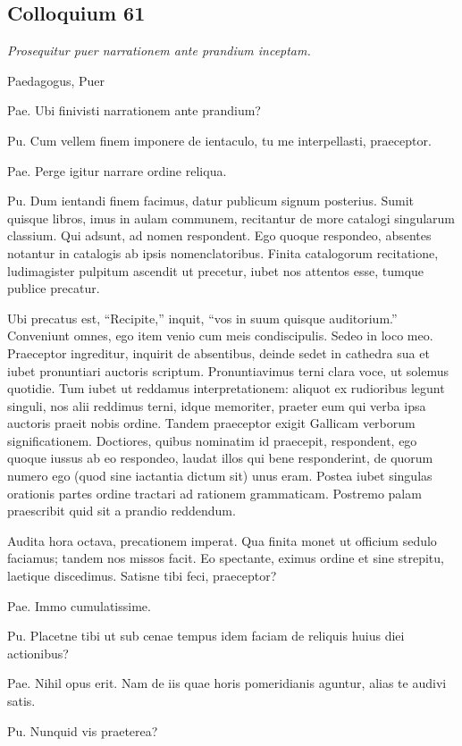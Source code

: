 \documentclass{article}
\begin{document}
\subsection{Colloquium 61}
\emph{Prosequitur puer narrationem ante prandium inceptam.}

Paedagogus, Puer

Pae. Ubi finivisti narrationem ante prandium?

Pu. Cum vellem finem imponere de ientaculo, tu me interpellasti, praeceptor. 

Pae. Perge igitur narrare ordine reliqua. 

Pu. Dum ientandi finem facimus, datur publicum signum posterius. Sumit quisque libros, imus in aulam communem, recitantur de more catalogi singularum classium. Qui adsunt, ad nomen respondent. Ego quoque respondeo, absentes notantur in catalogis ab ipsis nomenclatoribus. Finita catalogorum recitatione, ludimagister pulpitum ascendit ut precetur, iubet nos attentos esse, tumque publice precatur. 

Ubi precatus est, ``Recipite,'' inquit, ``vos in suum quisque auditorium.'' Conveniunt omnes, ego item venio cum meis condiscipulis. Sedeo in loco meo. Praeceptor ingreditur, inquirit de absentibus, deinde sedet in cathedra sua et iubet pronuntiari auctoris scriptum. Pronuntiavimus terni clara voce, ut solemus quotidie. Tum iubet ut reddamus interpretationem: aliquot ex rudioribus legunt singuli, nos alii reddimus terni, idque memoriter, praeter eum qui verba ipsa auctoris praeit nobis ordine. Tandem praeceptor exigit Gallicam verborum significationem. Doctiores, quibus nominatim id praecepit, respondent, ego quoque iussus ab eo respondeo, laudat illos qui bene responderint, de quorum numero ego (quod sine iactantia dictum sit) unus eram. Postea iubet singulas orationis partes ordine tractari ad rationem grammaticam. Postremo palam praescribit quid sit a prandio reddendum. 

Audita hora octava, precationem imperat. Qua finita monet ut officium sedulo faciamus; tandem nos missos facit. Eo spectante, eximus ordine et sine strepitu, laetique discedimus. Satisne tibi feci, praeceptor?

Pae. Immo cumulatissime. 

Pu. Placetne tibi ut sub cenae tempus idem faciam de reliquis huius diei actionibus?

Pae. Nihil opus erit. Nam de iis quae horis pomeridianis aguntur, alias te audivi satis. 

Pu. Nunquid vis praeterea?
\end{document}
